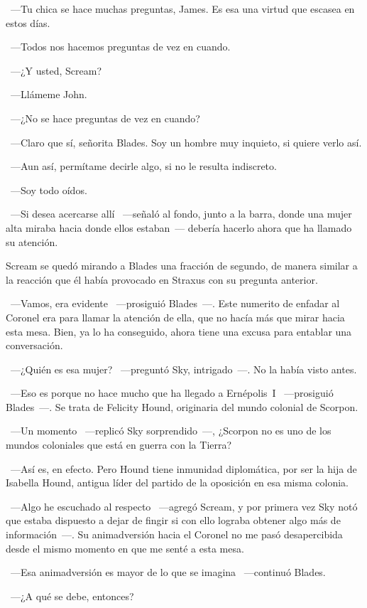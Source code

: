 ~---Tu chica se hace muchas preguntas, James. Es esa una virtud que escasea en estos días.

~---Todos nos hacemos preguntas de vez en cuando.

~---¿Y usted, Scream?

~---Llámeme John.

~---¿No se hace preguntas de vez en cuando?

~---Claro que sí, señorita Blades. Soy un hombre muy inquieto, si quiere verlo así.

~---Aun así, permítame decirle algo, si no le resulta indiscreto.

~---Soy todo oídos.

~---Si desea acercarse allí ~---señaló al fondo, junto a la barra, donde una mujer alta miraba hacia donde ellos estaban~--- debería hacerlo ahora que ha llamado su atención.

Scream se quedó mirando a Blades una fracción de segundo, de manera similar a la reacción que él había provocado en Straxus con su pregunta anterior.

~---Vamos, era evidente ~---prosiguió Blades~---. Este numerito de enfadar al Coronel era para llamar la atención de ella, que no hacía más que mirar hacia esta mesa. Bien, ya lo ha conseguido, ahora tiene una excusa para entablar una conversación.

~---¿Quién es esa mujer? ~---preguntó Sky, intrigado~---. No la había visto antes.

~---Eso es porque no hace mucho que ha llegado a Ernépolis~I ~---prosiguió Blades~---. Se trata de Felicity Hound, originaria del mundo colonial de Scorpon.

~---Un momento ~---replicó Sky sorprendido~---, ¿Scorpon no es uno de los mundos coloniales que está en guerra con la Tierra?

~---Así es, en efecto. Pero Hound tiene inmunidad diplomática, por ser la hija de Isabella Hound, antigua líder del partido de la oposición en esa misma colonia.

~---Algo he escuchado al respecto ~---agregó Scream, y por primera vez Sky notó que estaba dispuesto a dejar de fingir si con ello lograba obtener algo más de información~---. Su animadversión hacia el Coronel no me pasó desapercibida desde el mismo momento en que me senté a esta mesa.

~---Esa animadversión es mayor de lo que se imagina ~---continuó Blades.

~---¿A qué se debe, entonces?

